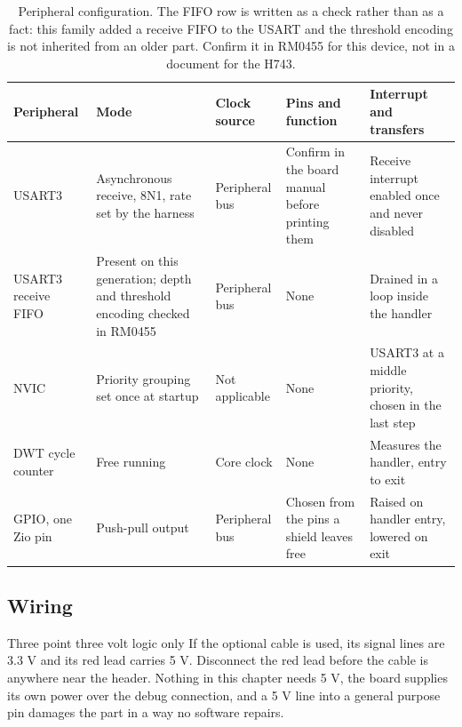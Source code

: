 \begin{table}[H]\centering\small
\begin{tabular}{p{22mm}p{26mm}p{24mm}p{30mm}p{30mm}}
\toprule
Peripheral & Mode & Clock source & Pins and function & Interrupt and transfers \\
\midrule
USART3 & Asynchronous receive, 8N1, rate set by the harness & Peripheral bus & Confirm in the board manual before printing them & Receive interrupt enabled once and never disabled \\
USART3 receive FIFO & Present on this generation; depth and threshold encoding checked in RM0455 & Peripheral bus & None & Drained in a loop inside the handler \\
NVIC & Priority grouping set once at startup & Not applicable & None & USART3 at a middle priority, chosen in the last step \\
DWT cycle counter & Free running & Core clock & None & Measures the handler, entry to exit \\
GPIO, one Zio pin & Push-pull output & Peripheral bus & Chosen from the pins a shield leaves free & Raised on handler entry, lowered on exit \\
\bottomrule
\end{tabular}
\caption{Peripheral configuration. The FIFO row is written as a check rather than as a fact: this family added a receive FIFO to the USART and the threshold encoding is not inherited from an older part. Confirm it in RM0455 for this device, not in a document for the H743.}
\end{table}

\subsection*{Wiring}


\begin{note}{Three point three volt logic only}
If the optional cable is used, its signal lines are 3.3 V and its red lead
carries 5 V. Disconnect the red lead before the cable is anywhere near the
header. Nothing in this chapter needs 5 V, the board supplies its own power over
the debug connection, and a 5 V line into a general purpose pin damages the
part in a way no software repairs.
\end{note}

